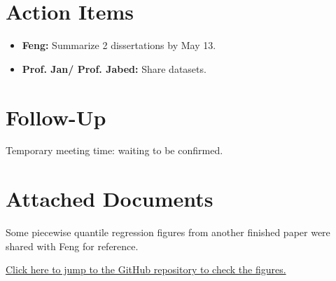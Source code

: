 \documentclass[11pt]{article}
\begin{document}
\section*{Action Items}
\begin{itemize}[leftmargin=1.5em]
    \item \textbf{Feng:} Summarize 2 dissertations by May 13.
    \item \textbf{Prof. Jan/ Prof. Jabed:} Share datasets.
\end{itemize}

\section*{Follow-Up}
Temporary meeting time: waiting to be confirmed.

\section{Attached Documents}
Some piecewise quantile regression figures from another finished paper were shared with Feng for reference.

\href{https://github.com/Gufeng-2002/Thesis_Meeting_Notes/tree/main/May_5th_25_meeting1/supportive_materials}{Click here to jump to the GitHub repository to check the figures.}
\end{document}
